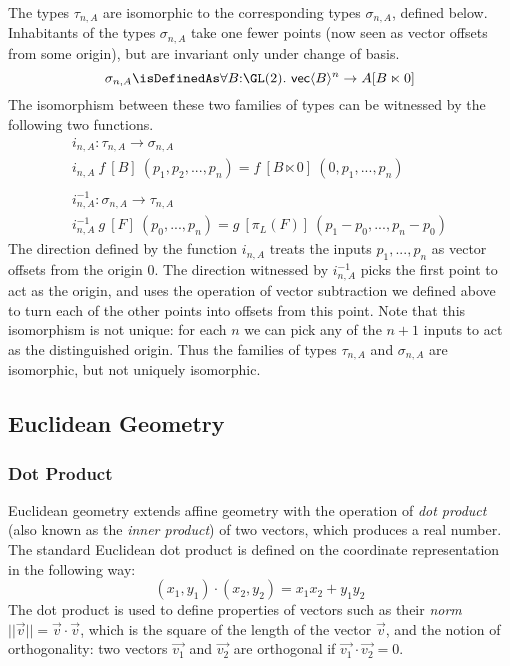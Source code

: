 \begin{example}
  The types $\tau_{n,A}$ are isomorphic to the corresponding types
  $\sigma_{n,A}$, defined below. Inhabitants of the types
  $\sigma_{n,A}$ take one fewer points (now seen as vector offsets
  from some origin), but are invariant only under change of basis.
  \begin{displaymath}
    \sigma_{n,A} \isDefinedAs \forall B\mathord:\GL(2).\ \mathsf{vec}\langle B \rangle^n \to A[B \ltimes 0]
  \end{displaymath}
  The isomorphism between these two families of types can be witnessed
  by the following two functions.
  \begin{displaymath}
    \begin{array}{l}
      i_{n,A} : \tau_{n,A} \to \sigma_{n,A} \\
      i_{n,A}\ f\ [B]\ (p_1, p_2, ..., p_n) = f\ [B \ltimes 0]\ (0, p_1, ..., p_n) \\
      \\
      i^{-1}_{n,A} : \sigma_{n,A} \to \tau_{n,A} \\
      i^{-1}_{n,A}\ g\ [F]\ (p_0, ..., p_n) = g\ [\pi_L(F)]\ (p_1-p_0, ..., p_n-p_0)
    \end{array}
  \end{displaymath}
  The direction defined by the function $i_{n,A}$ treats the inputs
  $p_1,...,p_n$ as vector offsets from the origin $0$. The direction
  witnessed by $i^{-1}_{n,A}$ picks the first point to act as the
  origin, and uses the operation of vector subtraction we defined
  above to turn each of the other points into offsets from this
  point. Note that this isomorphism is not unique: for each $n$ we can
  pick any of the $n+1$ inputs to act as the distinguished
  origin. Thus the families of types $\tau_{n,A}$ and $\sigma_{n,A}$
  are isomorphic, but not uniquely isomorphic.
\end{example}

\subsection{Euclidean Geometry}
\label{sec:euclidean-geom}

\subsubsection{Dot Product}

Euclidean geometry extends affine geometry with the operation of
\emph{dot product} (also known as the \emph{inner product}) of two
vectors, which produces a real number. The standard Euclidean dot
product is defined on the coordinate representation in the following
way:
\begin{displaymath}
  (x_1,y_1) \cdot (x_2,y_2) = x_1x_2 + y_1y_2
\end{displaymath}
The dot product is used to define properties of vectors such as their
\emph{norm} $||\vec{v}|| = \vec{v}\cdot\vec{v}$, which is the square
of the length of the vector $\vec{v}$, and the notion of
orthogonality: two vectors $\vec{v_1}$ and $\vec{v_2}$ are orthogonal
if $\vec{v_1}\cdot\vec{v_2} = 0$.


